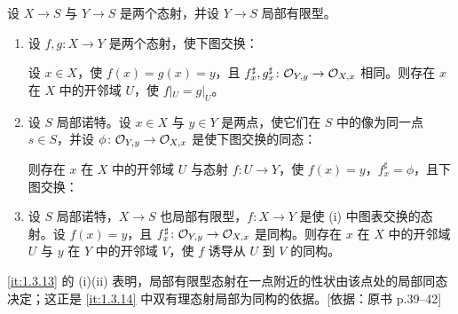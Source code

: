 \begin{proposition}\label{it:1.3.13}
设 $X\to S$ 与 $Y\to S$ 是两个态射，并设 $Y\to S$ 局部有限型。
\begin{enumerate}[label=(\roman*),leftmargin=2.8em]
  \item 设 $f,g\colon X\to Y$ 是两个态射，使下图交换：
  \begin{center}
  \end{center}
  设 $x\in X$，使 $f(x)=g(x)=y$，且 $f^\sharp_x,g^\sharp_x\colon \mathcal{O}_{Y,y}\to \mathcal{O}_{X,x}$ 相同。则存在 $x$ 在 $X$ 中的开邻域 $U$，使 $f|_U=g|_U$。
  \item 设 $S$ 局部诺特。设 $x\in X$ 与 $y\in Y$ 是两点，使它们在 $S$ 中的像为同一点 $s\in S$，并设 $\phi\colon \mathcal{O}_{Y,y}\to \mathcal{O}_{X,x}$ 是使下图交换的同态：
  \begin{center}
  \end{center}
  则存在 $x$ 在 $X$ 中的开邻域 $U$ 与态射 $f\colon U\to Y$，使 $f(x)=y$，$f^\sharp_x=\phi$，且下图交换：
  \begin{center}
  \end{center}
  \item 设 $S$ 局部诺特，$X\to S$ 也局部有限型，$f\colon X\to Y$ 是使 (i) 中图表交换的态射。设 $f(x)=y$，且 $f^\sharp_x\colon \mathcal{O}_{Y,y}\to \mathcal{O}_{X,x}$ 是同构。则存在 $x$ 在 $X$ 中的开邻域 $U$ 与 $y$ 在 $Y$ 中的开邻域 $V$，使 $f$ 诱导从 $U$ 到 $V$ 的同构。
\end{enumerate}
\end{proposition}

\begin{tnote}
\ref{it:1.3.13} 的 (i)(ii) 表明，局部有限型态射在一点附近的性状由该点处的局部同态决定；这正是 \ref{it:1.3.14} 中双有理态射局部为同构的依据。[依据：原书 p.39–42]
\end{tnote}

